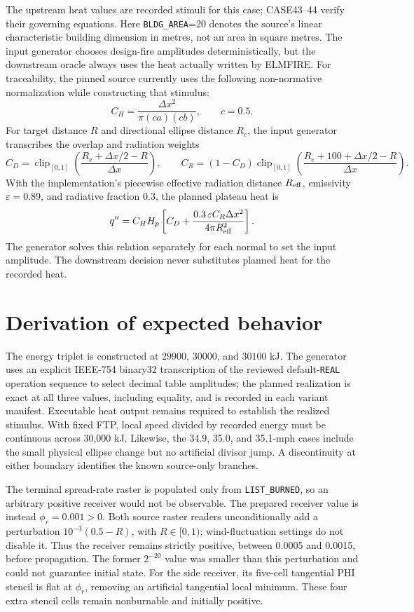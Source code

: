 The upstream heat values are recorded stimuli for this case; CASE43--44 verify
their governing equations. Here \texttt{BLDG\_AREA}=20 denotes the source's
linear characteristic building dimension in metres, not an area in square
metres. The input generator chooses design-fire amplitudes deterministically,
but the downstream oracle always uses the heat actually written by ELMFIRE.
For traceability, the pinned source currently uses the following non-normative
normalization while constructing that stimulus:
\[
 C_H=\frac{\Delta x^2}{\pi(ca)(cb)},\qquad c=0.5.
\]
For target distance \(R\) and directional ellipse distance \(R_e\), the input
generator transcribes the overlap and radiation weights
\[
 C_D=\operatorname{clip}_{[0,1]}\left(\frac{R_e+\Delta x/2-R}{\Delta x}\right),
 \qquad
 C_R=(1-C_D)\operatorname{clip}_{[0,1]}\left(\frac{R_e+100+\Delta x/2-R}{\Delta x}\right).
\]
With the implementation's piecewise effective radiation distance
\(R_{\rm eff}\), emissivity \(\varepsilon=0.89\), and radiative fraction 0.3,
the planned plateau heat is
\[
 q''=C_H H_p\left[C_D+\frac{0.3\,\varepsilon C_R\Delta x^2}
 {4\pi R_{\rm eff}^2}\right].
\]
The generator solves this relation separately for each normal to set the input
amplitude.  The downstream decision never substitutes planned heat for the
recorded heat.

\section{Derivation of expected behavior}

The energy triplet is constructed at \(29900\), \(30000\), and \(30100\) kJ.
The generator uses an explicit IEEE-754 binary32 transcription of the reviewed
default-\texttt{REAL} operation sequence to select decimal table amplitudes;
the planned realization is exact at all three values, including equality, and
is recorded in each variant manifest. Executable heat output remains required
to establish the realized stimulus. With fixed FTP, local speed divided by
recorded energy must be continuous across 30,000 kJ. Likewise, the 34.9,
35.0, and 35.1-mph cases include the small physical ellipse change but no
artificial divisor jump. A discontinuity at either boundary identifies the
known source-only branches.

The terminal spread-rate raster is populated only from \texttt{LIST\_BURNED},
so an arbitrary positive receiver would not be observable.  The prepared
receiver value is instead $\phi_r=0.001>0$. Both source raster readers
unconditionally add a perturbation $10^{-3}(0.5-R)$, with $R\in[0,1)$;
wind-fluctuation settings do not disable it. Thus the receiver remains
strictly positive, between 0.0005 and 0.0015, before propagation. The former
$2^{-20}$ value was smaller than this perturbation and could not guarantee
initial state. For the side receiver, its five-cell tangential PHI stencil is
flat at $\phi_r$, removing an artificial tangential local minimum. These
four extra stencil cells remain nonburnable and initially positive.

